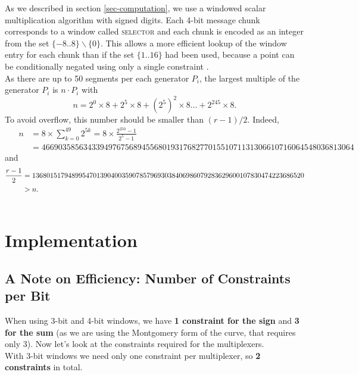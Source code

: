 \documentclass{article}
\begin{document}
\begin{spacing}{1.2}
	As we described in section \ref{sec-computation}, we use a windowed scalar multiplication algorithm with signed digits. Each 4-bit message chunk corresponds to a window called \textsc{selector} and each chunk is encoded as an integer from the set $\{-8..8\}\backslash \{0\}$. This allows a more efficient lookup of the window entry for each chunk than if the set $\{1..16\}$ had been used, because a point can be conditionally negated using only a single constraint \cite{sapling}.\\

	As there are up to 50 segments per each generator $P_i$, the largest multiple of the generator $P_i$ is $n\cdot P_i$ with 
	$$n = 2^0 \times8 + 2^5 \times 8 + \left(2^5\right)^2 \times8 \dots + 	2^{245}\times 8 .$$
	To avoid overflow, this number should be smaller than $(r-1)/2$. Indeed,
		\begin{align*}
			\quad\; n 
			& = 8 \times \sum_{ k = 0}^{49} 2^{5k}
			= 8 \times \frac{2^{250}-1}{2^5-1}\\
			& = 466903585634339497675689455680193176827701551071131306610716064548036813064%
		\end{align*}
		\vspace{-0.2cm}
	and 
		\begin{align*}
			\frac{r-1}{2} &= 1368015179489954701390400359078579693038406986079283629600107830474223686520 \\
			& > n.\\ \vspace{0.4cm}
		\end{align*}

\section{Implementation}

	\subsection{A Note on Efficiency: Number of Constraints per Bit}
	
	When using 3-bit and 4-bit windows, we have {{\bf 1 constraint for the sign}} and {{\bf 3 for the sum}} (as we are using the Montgomery form of the curve, that requires only 3). Now let's look at the constraints required for the multiplexers. \\
	
	With 3-bit windows we need only one constraint per multiplexer, so {\bf 2 constraints} in total. \\
	

\end{spacing}
\end{document}
